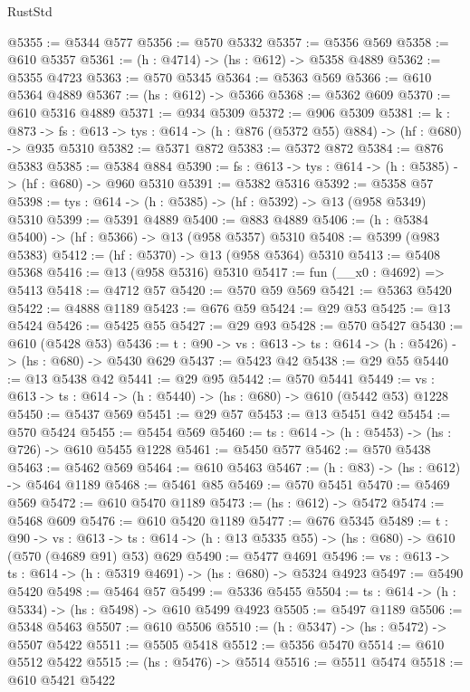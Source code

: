 \begin{lexlean}{RustStd}
\begin{coremodule}
@5355 := @5344 @577
@5356 := @570 @5332
@5357 := @5356 @569
@5358 := @610 @5357
@5361 := (h : @4714) -> (hs : @612) -> @5358 @4889
@5362 := @5355 @4723
@5363 := @570 @5345
@5364 := @5363 @569
@5366 := @610 @5364 @4889
@5367 := (hs : @612) -> @5366
@5368 := @5362 @609
@5370 := @610 @5316 @4889
@5371 := @934 @5309
@5372 := @906 @5309
@5381 := {k : @873} ->
  {fs : @613} -> {tys : @614} -> (h : @876 (@5372 @55) @884) -> (hf : @680) -> @935 @5310
@5382 := @5371 @872
@5383 := @5372 @872
@5384 := @876 @5383
@5385 := @5384 @884
@5390 := {fs : @613} -> {tys : @614} -> (h : @5385) -> (hf : @680) -> @960 @5310
@5391 := @5382 @5316
@5392 := @5358 @57
@5398 := {tys : @614} -> (h : @5385) -> (hf : @5392) -> @13 (@958 @5349) @5310
@5399 := @5391 @4889
@5400 := @883 @4889
@5406 := (h : @5384 @5400) -> (hf : @5366) -> @13 (@958 @5357) @5310
@5408 := @5399 (@983 @5383)
@5412 := (hf : @5370) -> @13 (@958 @5364) @5310
@5413 := @5408 @5368
@5416 := @13 (@958 @5316) @5310
@5417 := fun (__x0 : @4692) => @5413
@5418 := @4712 @57
@5420 := @570 @59 @569
@5421 := @5363 @5420
@5422 := @4888 @1189
@5423 := @676 @59
@5424 := @29 @53
@5425 := @13 @5424
@5426 := @5425 @55
@5427 := @29 @93
@5428 := @570 @5427
@5430 := @610 (@5428 @53)
@5436 := {t : @90} -> {vs : @613} -> {ts : @614} -> (h : @5426) -> (hs : @680) -> @5430 @629
@5437 := @5423 @42
@5438 := @29 @55
@5440 := @13 @5438 @42
@5441 := @29 @95
@5442 := @570 @5441
@5449 := {vs : @613} -> {ts : @614} -> (h : @5440) -> (hs : @680) -> @610 (@5442 @53) @1228
@5450 := @5437 @569
@5451 := @29 @57
@5453 := @13 @5451 @42
@5454 := @570 @5424
@5455 := @5454 @569
@5460 := {ts : @614} -> (h : @5453) -> (hs : @726) -> @610 @5455 @1228
@5461 := @5450 @577
@5462 := @570 @5438
@5463 := @5462 @569
@5464 := @610 @5463
@5467 := (h : @83) -> (hs : @612) -> @5464 @1189
@5468 := @5461 @85
@5469 := @570 @5451
@5470 := @5469 @569
@5472 := @610 @5470 @1189
@5473 := (hs : @612) -> @5472
@5474 := @5468 @609
@5476 := @610 @5420 @1189
@5477 := @676 @5345
@5489 := {t : @90} ->
  {vs : @613} ->
  {ts : @614} -> (h : @13 @5335 @55) -> (hs : @680) -> @610 (@570 (@4689 @91) @53) @629
@5490 := @5477 @4691
@5496 := {vs : @613} -> {ts : @614} -> (h : @5319 @4691) -> (hs : @680) -> @5324 @4923
@5497 := @5490 @5420
@5498 := @5464 @57
@5499 := @5336 @5455
@5504 := {ts : @614} -> (h : @5334) -> (hs : @5498) -> @610 @5499 @4923
@5505 := @5497 @1189
@5506 := @5348 @5463
@5507 := @610 @5506
@5510 := (h : @5347) -> (hs : @5472) -> @5507 @5422
@5511 := @5505 @5418
@5512 := @5356 @5470
@5514 := @610 @5512 @5422
@5515 := (hs : @5476) -> @5514
@5516 := @5511 @5474
@5518 := @610 @5421 @5422

\end{coremodule}
\end{lexlean}
